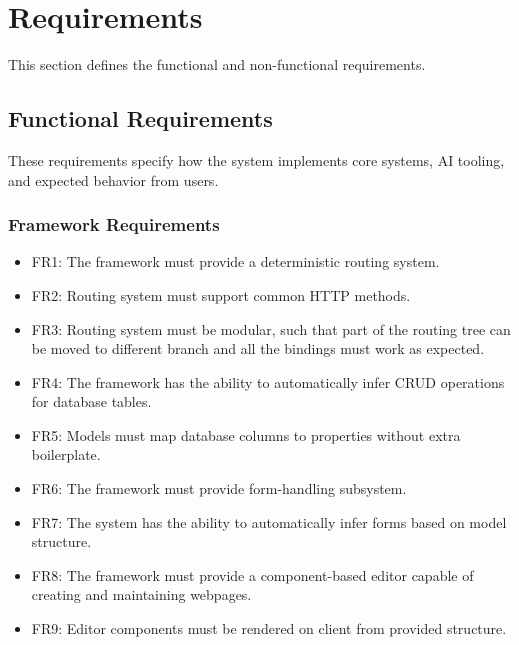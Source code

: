 \chapter{Requirements}\label{ch:requirements}
This section defines the functional and non-functional requirements.

\section{Functional Requirements}\label{sec:functional-requirements}
These requirements specify how the system implements core systems, AI tooling, and expected behavior from users.

\subsection*{Framework Requirements}\label{subsec:framework-requirements}
\begin{itemize}
    \item FR1: The framework must provide a deterministic routing system.
    \item FR2: Routing system must support common HTTP methods.
    \item FR3: Routing system must be modular, such that part of the routing tree can be moved to different branch
        and all the bindings must work as expected.
    \item FR4: The framework has the ability to automatically infer CRUD operations for database tables.
    \item FR5: Models must map database columns to properties without extra boilerplate.
    \item FR6: The framework must provide form-handling subsystem.
    \item FR7: The system has the ability to automatically infer forms based on model structure.
    \item FR8: The framework must provide a component-based editor capable of creating and maintaining webpages.
    \item FR9: Editor components must be rendered on client from provided structure.
\end{itemize}

